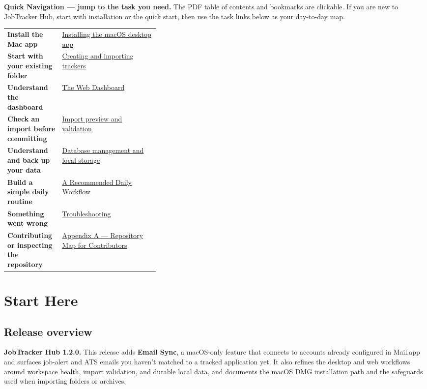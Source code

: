 \documentclass[11pt]{article}
\begin{document}
\begin{infobox}
\textbf{Quick Navigation — jump to the task you need.} The PDF table of contents and bookmarks are clickable. If you are new to JobTracker Hub, start with installation or the quick start, then use the task links below as your day-to-day map.
\vspace{3pt}
\small\begin{tabularx}{\linewidth}{@{}>{\bfseries}p{0.36\linewidth}X@{}}
Install the Mac app & \hyperref[subsec:macos]{Installing the macOS desktop app} \\
Start with your existing folder & \hyperref[subsec:workspaces-create]{Creating and importing trackers} \\
Understand the dashboard & \hyperref[sec:dashboard]{The Web Dashboard} \\
Check an import before committing & \hyperref[subsec:import-preview]{Import preview and validation} \\
Understand and back up your data & \hyperref[subsec:database]{Database management and local storage} \\
Build a simple daily routine & \hyperref[sec:daily]{A Recommended Daily Workflow} \\
Something went wrong & \hyperref[sec:troubleshooting]{Troubleshooting} \\
Contributing or inspecting the repository & \hyperref[sec:contributors]{Appendix A --- Repository Map for Contributors}
\end{tabularx}
\end{infobox}
\newpage

\section{Start Here}\label{sec:start}

\subsection{Release overview}

\begin{infobox}
\textbf{JobTracker Hub 1.2.0.} This release adds \textbf{Email Sync}, a macOS-only feature that connects to accounts already configured in Mail.app and surfaces job-alert and ATS emails you haven't matched to a tracked application yet. It also refines the desktop and web workflows around workspace health, import validation, and durable local data, and documents the macOS DMG installation path and the safeguards used when importing folders or archives.
\end{infobox}
\end{document}
